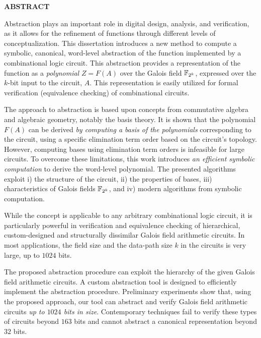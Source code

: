 \begin{center}{\bf ABSTRACT}\end{center}


Abstraction plays an important role in digital design,
analysis, and verification, as it allows for the refinement of
functions through different levels of conceptualization. This dissertation
introduces a new method to compute a symbolic, canonical, word-level abstraction of the function implemented
by a combinational logic circuit. This abstraction provides a
representation of the function as a {\it polynomial} $Z = F (A)$
over the Galois field ${\mathbb{F}}_{2^k}$, expressed over the $k$-bit input to the circuit, $A$.
This representation is easily utilized for formal verification (equivalence checking) of
combinational circuits.

The approach to abstraction is based upon concepts from
commutative algebra and algebraic geometry, notably the
\Grobner basis theory. It is shown that the polynomial $F(A)$ can
be derived {\it by computing a \Grobner basis of the polynomials}
corresponding to the circuit, using a specific elimination term
order based on the circuit’s topology. However, computing \Grobner bases
using elimination term orders is infeasible for large circuits.
To overcome these limitations, this work introduces {\it an efficient symbolic
computation} to derive the word-level polynomial. The presented algorithms
exploit i) the structure of the circuit, ii) the properties of \Grobner bases,
iii) characteristics of Galois fields ${\mathbb{F}}_{2^k}$, and iv) modern algorithms from symbolic computation.

While the concept is
applicable to any arbitrary combinational logic circuit, it 
is particularly powerful in verification and equivalence checking of 
hierarchical, custom-designed and structurally dissimilar Galois field arithmetic circuits. 
In most applications, the field size and the data-path size $k$
in the circuits is very large, up to $1024$ bits.

The proposed abstraction procedure can exploit the hierarchy of the
given Galois field arithmetic circuits.
A custom abstraction %
tool is designed to efficiently implement the abstraction procedure.
Preliminary experiments show that, using the proposed approach, our
tool can abstract and verify Galois field arithmetic circuits
{\it up to $1024$ bits in size}. %
Contemporary
techniques fail to verify these types of circuits beyond $163$ bits
and cannot abstract a canonical representation beyond $32$ bits.

